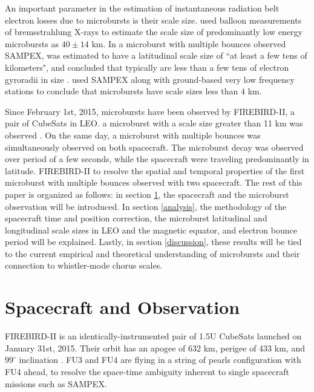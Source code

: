 \documentclass[draft, linenumbers]{agujournal}
\begin{document}
An important parameter in the estimation of instantaneous radiation belt electron losses due to microbursts is their scale size. \citet{Parks1967} used balloon measurements of bremsstrahlung X-rays to estimate the scale size of predominantly low energy microbursts as $40 \pm 14$ km. In \citet{Blake1996} a microburst with multiple bounces  observed   SAMPEX, was estimated to have a latitudinal scale size of ``at least a few tens of kilometers", and  concluded that typically  are less than a few tens of electron gyroradii in size . \citet{Dietrich2010} used SAMPEX along with ground-based very low frequency stations to conclude that microbursts have scale sizes less than $4$ km.

Since February 1st, 2015, microbursts have been observed by FIREBIRD-II, a pair of CubeSats in LEO.  a microburst with a scale size greater than 11 km was observed \citep{Crew2016}. On the same day, a microburst with multiple bounces was simultaneously observed on both spacecraft. The microburst decay was observed over  period of a few seconds, while the spacecraft were traveling predominantly in latitude.  FIREBIRD-II to resolve the spatial and temporal properties of the first microburst with multiple bounces observed with two spacecraft. The rest of this paper is organized as follows: in section \ref{obs}, the spacecraft and the microburst observation will be introduced. In section \ref{analysis}, the methodology of the spacecraft time and position correction, the microburst latitudinal and longitudinal scale sizes in LEO and the magnetic equator, and electron bounce period will be explained. Lastly, in section \ref{discussion}, these results will be tied to the current empirical and theoretical understanding of microbursts and their connection to whistler-mode chorus scales.

\section{Spacecraft and Observation} \label{obs} %
FIREBIRD-II is an identically-instrumented pair of 1.5U CubeSats  launched on January 31st, 2015. Their orbit has an apogee of 632 km, perigee of 433 km, and $99^{\circ}$ inclination \citep{Crew2016}. FU3 and FU4 are flying in a string of pearls configuration with FU4 ahead, to resolve the space-time ambiguity inherent to single spacecraft missions such as SAMPEX.
\end{document}
